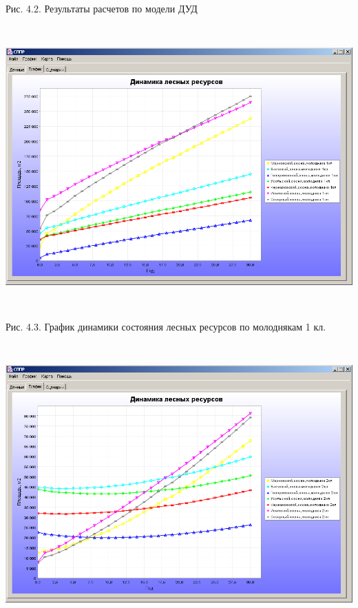 \documentclass{article}
\begin{document}
\begin{center}
Рис. 4.2. Результаты расчетов по модели ДУД 

\includegraphics[width=449pt, height=307pt, keepaspectratio=true]{asyaDisser9_3-fig014.png}

Рис. 4.3. График динамики состояния лесных ресурсов 
по молоднякам 1 кл.

\includegraphics[width=449pt, height=307pt, keepaspectratio=true]{asyaDisser9_3-fig015.png}


\end{center}
\end{document}
